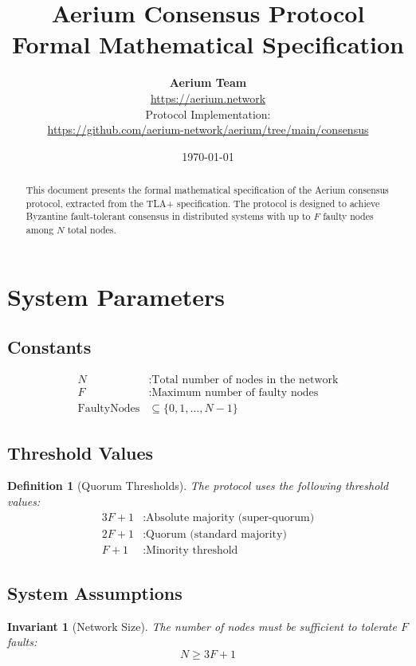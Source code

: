 \documentclass[11pt,a4paper,twoside]{article}
\title{\vspace{-1cm}
    \textbf{\LARGE Aerium Consensus Protocol}\\[0.5cm]
    \Large Formal Mathematical Specification
    \vspace{-0.5cm}
}
\author{
    \textbf{Aerium Team}\\[0.3cm]
    \small \url{https://aerium.network}\\[0.2cm]
    \small Protocol Implementation: \\
    \small \url{https://github.com/aerium-network/aerium/tree/main/consensus}
}
\date{\today}
\newtheorem{definition}{Definition}[section]
\newtheorem{invariant}{Invariant}[section]
\begin{document}
\maketitle

\begin{abstract}
This document presents the formal mathematical specification of the Aerium consensus protocol, extracted from the TLA+ specification. The protocol is designed to achieve Byzantine fault-tolerant consensus in distributed systems with up to $F$ faulty nodes among $N$ total nodes.
\end{abstract}

\tableofcontents
\newpage

\section{System Parameters}

\subsection{Constants}
\begin{align}
N &: \text{Total number of nodes in the network} \\
F &: \text{Maximum number of faulty nodes} \\
\text{FaultyNodes} &\subseteq \{0, 1, \ldots, N-1\}
\end{align}

\subsection{Threshold Values}
\begin{definition}[Quorum Thresholds]
The protocol uses the following threshold values:
\begin{align}
3F + 1 &: \text{Absolute majority (super-quorum)} \\
2F + 1 &: \text{Quorum (standard majority)} \\
F + 1 &: \text{Minority threshold}
\end{align}
\end{definition}

\subsection{System Assumptions}
\begin{invariant}[Network Size]
The number of nodes must be sufficient to tolerate $F$ faults:
\begin{equation}
N \geq 3F + 1
\end{equation}
\end{invariant}
\end{document}
